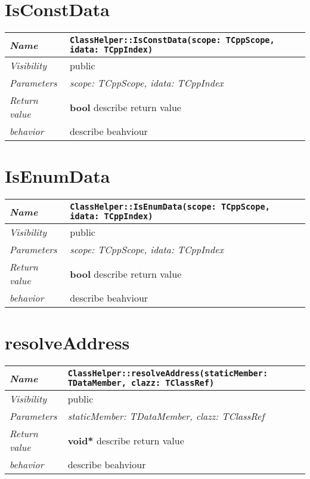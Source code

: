  \section{IsConstData}
\begin{longtable}{p{3cm} @{\hskip 1cm} p{12cm}}
 \hline
\textit{Name} & \texttt{ClassHelper::IsConstData(scope: TCppScope, idata: TCppIndex)}\\
\hline
 \textit{Visibility} & public\\
\hline
\textit{Parameters} & \textit{scope: TCppScope, idata: TCppIndex}\\
\hline
\textit{Return value} & \textbf{ bool} describe return value\\
  \hline
 \textit{behavior} & describe beahviour \\
\hline
\end{longtable} \pagebreak
 \section{IsEnumData}
\begin{longtable}{p{3cm} @{\hskip 1cm} p{12cm}}
 \hline
\textit{Name} & \texttt{ClassHelper::IsEnumData(scope: TCppScope, idata: TCppIndex)}\\
\hline
 \textit{Visibility} & public\\
\hline
\textit{Parameters} & \textit{scope: TCppScope, idata: TCppIndex}\\
\hline
\textit{Return value} & \textbf{ bool} describe return value\\
  \hline
 \textit{behavior} & describe beahviour \\
\hline
\end{longtable} \pagebreak
 \section{resolveAddress}
\begin{longtable}{p{3cm} @{\hskip 1cm} p{12cm}}
 \hline
\textit{Name} & \texttt{ClassHelper::resolveAddress(staticMember: TDataMember, clazz: TClassRef)}\\
\hline
 \textit{Visibility} & public\\
\hline
\textit{Parameters} & \textit{staticMember: TDataMember, clazz: TClassRef}\\
\hline
\textit{Return value} & \textbf{ void*} describe return value\\
  \hline
 \textit{behavior} & describe beahviour \\
\hline
\end{longtable} \pagebreak
